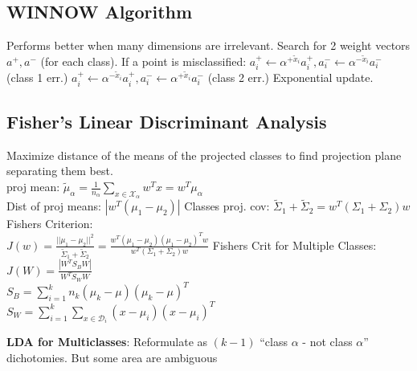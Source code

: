 \subsection*{WINNOW Algorithm}
Performs better when many dimensions are irrelevant. Search for 2 weight vectors $a^+, a^-$ (for each class). If a point is misclassified:
$a_i^+ {\leftarrow} \alpha^{+\tilde{x}_i}a_i^+, a_i^- {\leftarrow} \alpha^{-\tilde{x}_i}a_i^-$ (class 1 err.)
$a_i^+ {\leftarrow} \alpha^{-\tilde{x}_i}a_i^+, a_i^- {\leftarrow} \alpha^{+\tilde{x}_i}a_i^-$ (class 2 err.)
Exponential update.

\subsection*{Fisher's Linear Discriminant Analysis}
Maximize distance of the means of the projected classes to find projection plane separating them best.\\
proj mean: $\tilde{\mu}_{\alpha}{=}\frac{1}{n_{\alpha}}\sum_{x\in\mathcal{X}_{\alpha}}w^Tx{=}w^T\mu_{\alpha}$\\
Dist of proj means: $|w^T(\mu_1-\mu_2)|$
Classes proj. cov: $\tilde{\Sigma}_1{+}\tilde{\Sigma}_2{=}w^T(\Sigma_1{+}\Sigma_2)w$\\
Fishers Criterion:\\
$J(w)=\frac{||\mu_1-\mu_2||^2}{\tilde{\Sigma}_1{+}\tilde{\Sigma}_2}=\frac{w^T(\mu_1-\mu_2)(\mu_1-\mu_2)^Tw}{w^T(\Sigma_1{+}\Sigma_2)w}$
Fishers Crit for Multiple Classes:\\
$J(W)=\frac{|W^TS_BW|}{W^TS_WW}$\\
$S_B=\sum_{i=1}^kn_k(\mu_k-\mu)(\mu_k-\mu)^T$\\
$S_W=\sum_{i=1}^k\sum_{x\in \mathcal{D}_i}(x-\mu_i)(x-\mu_i)^T$

\textbf{LDA for Multiclasses}: 
Reformulate as $(k-1)$ ``class $\alpha$ - not class $\alpha$'' dichotomies. But some area are ambiguous

